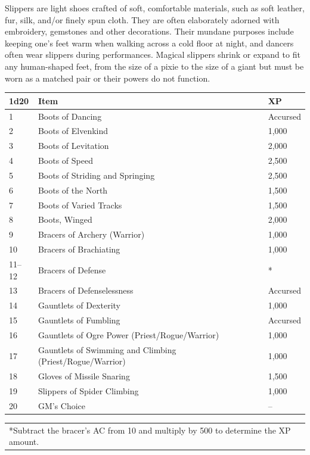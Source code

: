 \begin{multicols}{2}
Slippers are light shoes crafted of soft, comfortable materials, such as soft leather, fur, silk, and/or finely spun cloth.  They are often elaborately adorned with embroidery, gemstones and other decorations.  Their mundane purposes include keeping one's feet warm when walking across a cold floor at night, and dancers often wear slippers during performances.  Magical slippers shrink or expand to fit any human-shaped feet, from the size of a pixie to the size of a giant but must be worn as a matched pair or their powers do not function.  

\noindent
\begin{minipage}{\columnwidth}

\label{bootsgloves}
\noindent
\begin{tabular}{|p{}|p{}|p{}|}
\hline
1d20	& Item	& XP \\
\hline\hline
\rowcolor[gray]{.9}1	& Boots of Dancing	& Accursed \\
2	& Boots of Elvenkind	& 1,000 \\
\rowcolor[gray]{.9}3	& Boots of Levitation	& 2,000 \\
4	& Boots of Speed	& 2,500 \\
\rowcolor[gray]{.9}5	& Boots of Striding and Springing	& 2,500 \\
6	& Boots of the North	& 1,500 \\
\rowcolor[gray]{.9}7	& Boots of Varied Tracks	& 1,500 \\
8	& Boots, Winged	& 2,000 \\
\rowcolor[gray]{.9}9	& Bracers of Archery (Warrior)	& 1,000 \\
10	& Bracers of Brachiating	& 1,000 \\
\rowcolor[gray]{.9}11--12	& Bracers of Defense	& * \\
13	& Bracers of Defenselessness	& Accursed \\
\rowcolor[gray]{.9}14	& Gauntlets of Dexterity	& 1,000 \\
15	& Gauntlets of Fumbling	& Accursed \\
\rowcolor[gray]{.9}16	& Gauntlets of Ogre Power (Priest/Rogue/Warrior)	& 1,000 \\
17	& Gauntlets of Swimming and Climbing (Priest/Rogue/Warrior)	& 1,000 \\
\rowcolor[gray]{.9}18	& Gloves of Missile Snaring	& 1,500 \\
19	& Slippers of Spider Climbing	& 1,000 \\
\rowcolor[gray]{.9}20	& GM's Choice	& -- \\
\hline
\end{tabular}
\noindent\begin{tabular}{p{}}
*Subtract the bracer's AC from 10 and multiply by 500 to determine the XP amount. \\
\end{tabular}\vspace{.5em}


\end{minipage}
\end{multicols}
